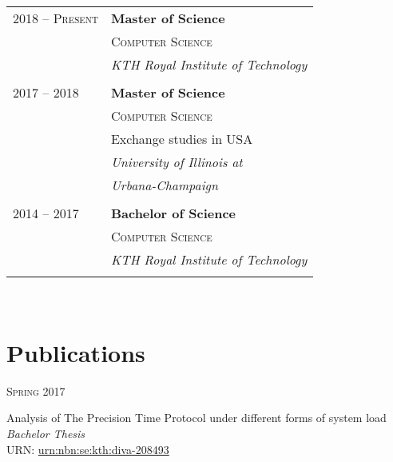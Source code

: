 \documentclass[10pt]{article} %
\begin{document}
{\begin{minipage}[t]{0.44\textwidth}
\begin{tabular}{ll} %


2018 -- \textsc{Present} & \textbf{Master of Science} \\ 
& \textsc{Computer Science} \\ 
& \textit{KTH Royal Institute of Technology}\\
&\\
	 
2017 -- 2018 & \textbf{Master of Science} \\ 
& \textsc{Computer Science} \\ 
& \small Exchange studies in USA\\
& \textit{University of Illinois at} \\
& \textit{Urbana-Champaign} \\
&\\

2014 -- 2017 & \textbf{Bachelor of Science} \\ 
& \textsc{Computer Science} \\ 
& \textit{KTH Royal Institute of Technology}\\
&\\
	

\end{tabular}\\[10pt]

\section{Publications}

{\raggedleft\textsc{Spring 2017}\par}

{\raggedright\large Analysis of The Precision Time Protocol under different
    forms of system load\\ \textit{Bachelor Thesis} \\[2pt] \small URN:
    \href{http://www.diva-portal.org/smash/record.jsf?pid=diva2:1106630}{urn:nbn:se:kth:diva-208493}\\[5pt]}


\end{minipage}}
\end{document}
